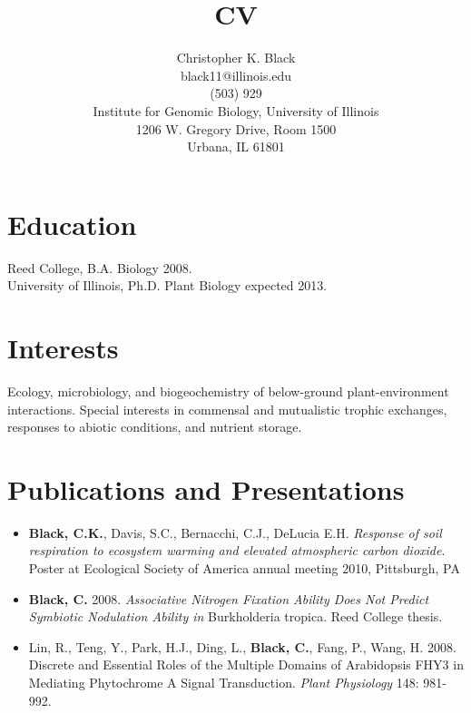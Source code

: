 \documentclass[centered,margin, 11pt]{resume}
\title{CV}
\author{Christopher K. Black\\
black11@illinois.edu\\
(503) 929\textendash 9421\\
Institute for Genomic Biology, University of Illinois\\
1206 W. Gregory Drive, Room 1500\\
Urbana, IL 61801}
\begin{document}
\maketitle

\section{Education}
Reed College, B.A. Biology 2008.\\
University of Illinois, Ph.D. Plant Biology expected 2013. 

\section{Interests}
Ecology, microbiology, and biogeochemistry of below-ground plant-environment interactions. Special interests in commensal and mutualistic trophic exchanges, responses to abiotic conditions, and nutrient storage.

\section{Publications and Presentations}
\begin{itemize}
	\item{{\bf Black, C.K.}, Davis, S.C., Bernacchi, C.J., DeLucia E.H. \textit{Response of soil respiration to ecosystem warming and elevated atmospheric carbon dioxide}. Poster at Ecological Society of America annual meeting 2010, Pittsburgh, PA}
	\item{{\bf Black, C.} 2008. \textit{Associative Nitrogen Fixation Ability Does Not Predict Symbiotic Nodulation Ability in} Burkholderia tropica. Reed College thesis.}
	\item{Lin, R., Teng, Y., Park, H.J., Ding, L., {\bf Black, C.}, Fang, P., Wang, H. 2008. Discrete and Essential Roles of the Multiple Domains of Arabidopsis FHY3 in Mediating Phytochrome A Signal Transduction. \textit{Plant Physiology} 148: 981-992.}
\end{itemize}
\end{document}
